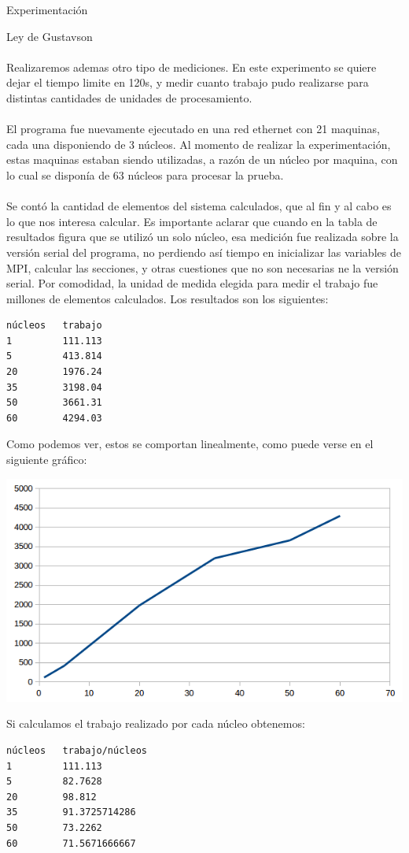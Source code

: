 \begin{section}{Experimentación}
\begin{subsection}{Ley de Gustavson}
~\\
~\\
Realizaremos ademas otro tipo de mediciones. En este experimento se quiere dejar el tiempo limite en 120s, y medir cuanto trabajo pudo realizarse para distintas cantidades de unidades de procesamiento.
~\\
~\\ 
El programa fue nuevamente ejecutado en una red ethernet con 21 maquinas, cada una disponiendo de 3 núcleos. Al momento de realizar la experimentación, estas maquinas estaban siendo utilizadas, a razón de un núcleo por maquina, con lo cual se disponía de 63 núcleos para procesar la prueba. 
~\\
~\\
Se contó la cantidad de elementos del sistema calculados, que al fin y al cabo es lo que nos interesa calcular. Es importante aclarar que cuando en la tabla de resultados figura que se utilizó un solo núcleo, esa medición fue realizada sobre la versión serial del programa, no perdiendo así tiempo en inicializar las variables de MPI, calcular las secciones, y otras cuestiones que no son necesarias ne la versión serial. Por comodidad, la unidad de medida elegida para medir el trabajo fue millones de elementos calculados. Los resultados son los siguientes:
~\\
\begin{verbatim}
núcleos   trabajo
1         111.113
5         413.814
20        1976.24
35        3198.04
50        3661.31
60        4294.03
\end{verbatim}

Como podemos ver, estos se comportan linealmente, como puede verse en el siguiente gráfico:

\includegraphics{Gustavson}

Si calculamos el trabajo realizado por cada núcleo obtenemos:
\begin{verbatim}
núcleos   trabajo/núcleos
1         111.113
5         82.7628
20        98.812
35        91.3725714286
50        73.2262
60        71.5671666667
\end{verbatim}


\end{subsection}
\end{section}
